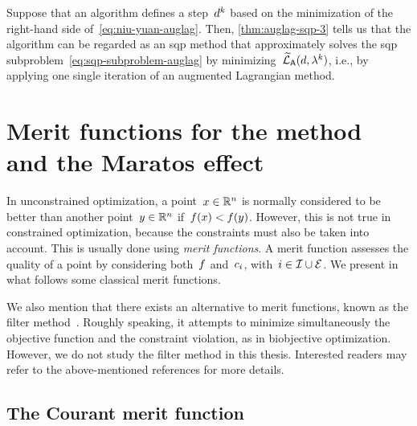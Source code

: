 Suppose that an algorithm defines a step~$\step[k]$ based on the minimization of the right-hand side of~\cref{eq:niu-yuan-auglag}.
Then, \cref{thm:auglag-sqp-3} tells us that the algorithm can be regarded as an \gls{sqp} method that approximately solves the \gls{sqp} subproblem~\cref{eq:sqp-subproblem-auglag} by minimizing~$\auglagalt(\step, \lm[k])$, i.e., by applying one single iteration of an augmented Lagrangian method.

\section{Merit functions for the  method and the Maratos effect}
\label{sec:sqp-merit-functions}

In unconstrained optimization, a point~$x \in \mathbb{R}^n$ is normally considered to be better than another point~$y \in \mathbb{R}^n$ if~$f(x) < f(y)$.
However, this is not true in constrained optimization, because the constraints must also be taken into account.
This is usually done using \emph{merit functions}.
A merit function assesses the quality of a point by considering both~$f$ and~$c_{i}$, with~$i \in \mathcal{I} \cup \mathcal{E}$.
We present in what follows some classical merit functions.

We also mention that there exists an alternative to merit functions, known as the filter method~\cite{Fletcher_Leyffer_2002,Fletcher_Leyffer_Toint_1998,Fletcher_Leyffer_Toint_2002,Fletcher_Leyffer_Toint_2006,Riberio_Karas_Gonzaga_2008}.
Roughly speaking, it attempts to minimize simultaneously the objective function and the constraint violation, as in biobjective optimization.
However, we do not study the filter method in this thesis.
Interested readers may refer to the above-mentioned references for more details.

\subsection{The Courant merit function}

